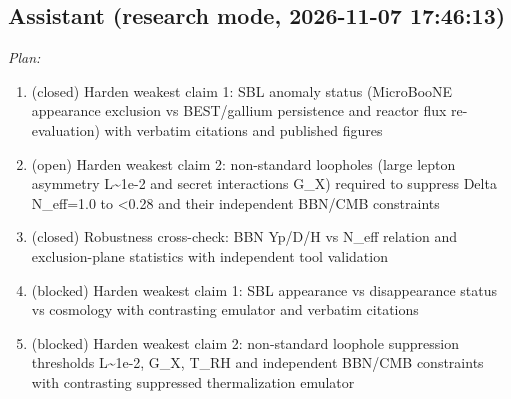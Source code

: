\documentclass[11pt,a4paper]{article}
\begin{document}
\subsection*{Assistant \small(research mode, 2026-11-07 17:46:13)}
\textit{Plan:}\begin{enumerate}
  \item (closed) Harden weakest claim 1: SBL anomaly status (MicroBooNE appearance exclusion vs BEST/gallium persistence and reactor flux re-evaluation) with verbatim citations and published figures
  \item (open) Harden weakest claim 2: non-standard loopholes (large lepton asymmetry L\textasciitilde{}1e-2 and secret interactions G\_X) required to suppress Delta N\_eff=1.0 to \textless{}0.28 and their independent BBN/CMB constraints
  \item (closed) Robustness cross-check: BBN Yp/D/H vs N\_eff relation and exclusion-plane statistics with independent tool validation
  \item (blocked) Harden weakest claim 1: SBL appearance vs disappearance status vs cosmology with contrasting emulator and verbatim citations
  \item (blocked) Harden weakest claim 2: non-standard loophole suppression thresholds L\textasciitilde{}1e-2, G\_X, T\_RH and independent BBN/CMB constraints with contrasting suppressed thermalization emulator
\end{enumerate}
\end{document}
